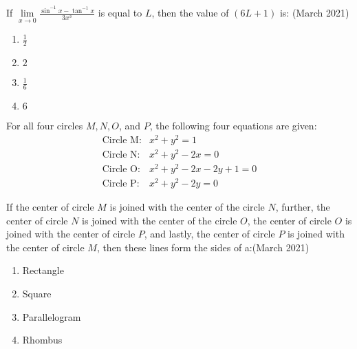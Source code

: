 \iffalse


\title{assignment}
\author{EE24BTECH11020}
\section{mcq-single}
\fi







\item If $\lim\limits_{x \to 0} \frac{\sin^{-1} x - \tan^{-1} x}{3x^3}$ is equal to $L$, then the value of $(6L + 1)$ is: \hfill (March 2021)
\begin{multicols}{4}
\begin{enumerate}
     \item $\frac{1}{2}$
    \item $2$
    \item $\frac{1}{6}$
    \item $6$
\end{enumerate}
\end{multicols}

   
\item For all four circles $M, N, O$, and $P$, the following four equations are given:
\begin{align*}
\text{Circle M}:  &  x^2 + y^2 = 1 \\
\text{Circle N}:  &  x^2 + y^2 - 2x = 0 \\
\text{Circle O}:  &  x^2 + y^2 - 2x - 2y + 1 = 0 \\
\text{Circle P}:  &  x^2 + y^2 - 2y = 0
\end{align*}

If the center of circle $M$ is joined with the center of the circle $N$, further, the center of circle $N$ is joined with the center of the circle $O$, the center of circle $O$ is joined with the center of circle $P$, and lastly, the center of circle $P$ is joined with the center of circle $M$, then these lines form the sides of a:\hfill (March 2021)
\begin{multicols}{2}
\begin{enumerate}
    \item Rectangle
    \item Square
    \item Parallelogram
    \item Rhombus
\end{enumerate}
    
\end{multicols}


